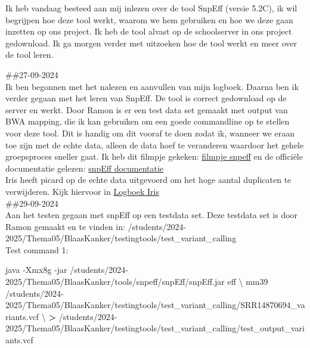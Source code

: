 \documentclass[
]{article}
\newenvironment{Shaded}{\begin{snugshade}}{\end{snugshade}}
\newcommand{\AttributeTok}[1]{\textcolor[rgb]{0.13,0.29,0.53}{#1}}
\newcommand{\DataTypeTok}[1]{\textcolor[rgb]{0.13,0.29,0.53}{#1}}
\newcommand{\ExtensionTok}[1]{#1}
\newcommand{\NormalTok}[1]{#1}
\newcommand{\OperatorTok}[1]{\textcolor[rgb]{0.81,0.36,0.00}{\textbf{#1}}}
\begin{document}
Ik heb vandaag besteed aan mij inlezen over de tool SnpEff (versie
5.2C), ik wil begrijpen hoe deze tool werkt, waarom we hem gebruiken en
hoe we deze gaan inzetten op ons project. Ik heb de tool alvast op de
schoolserver in ons project gedownload. Ik ga morgen verder met
uitzoeken hoe de tool werkt en meer over de tool leren.

\#\#27-09-2024\\
Ik ben begonnen met het nalezen en aanvullen van mijn logboek. Daarna
ben ik verder gegaan met het leren van SnpEff. De tool is correct
gedownload op de server en werkt. Door Ramon is er een test data set
gemaakt met output van BWA mapping, die ik kan gebruiken om een goede
commandline op te stellen voor deze tool. Dit is handig om dit vooraf te
doen zodat ik, wanneer we eraan toe zijn met de echte data, alleen de
data hoef te veranderen waardoor het gehele groepsproces sneller gaat.
Ik heb dit filmpje gekeken:
\href{https://www.youtube.com/watch?v=-rmreyRAbkE&t=544s}{filmpje
snpeff} en de officiële documentatie gelezen:
\href{https://pcingola.github.io/SnpEff/snpeff/introduction/}{snpEff
documentatie}\\

Iris heeft picard op de echte data uitgevoerd om het hoge aantal
duplicaten te verwijderen. Kijk hiervoor in
\href{https://github.com/RamonReilman/GenomicsTranscriptomics}{Logboek
Iris}\\

\#\#29-09-2024\\
Aan het testen gegaan met snpEff op een testdata set. Deze testdata set
is door Ramon gemaakt en te vinden in:
/students/2024-2025/Thema05/BlaasKanker/testingtools/test\_variant\_calling\\

Test command 1:\\

\begin{Shaded}
\begin{Highlighting}[]
\ExtensionTok{java} \AttributeTok{{-}Xmx8g} \AttributeTok{{-}jar}\NormalTok{ /students/2024{-}2025/Thema05/BlaasKanker/tools/snpeff/snpEff/snpEff.jar eff }\DataTypeTok{\textbackslash{}}
\NormalTok{mm39 /students/2024{-}2025/Thema05/BlaasKanker/testingtools/test\_variant\_calling/SRR14870694\_variants.vcf }\DataTypeTok{\textbackslash{}}
\OperatorTok{\textgreater{}}\NormalTok{ /students/2024{-}2025/Thema05/BlaasKanker/testingtools/test\_variant\_calling/test\_output\_variants.vcf}
\end{Highlighting}
\end{Shaded}
\end{document}
